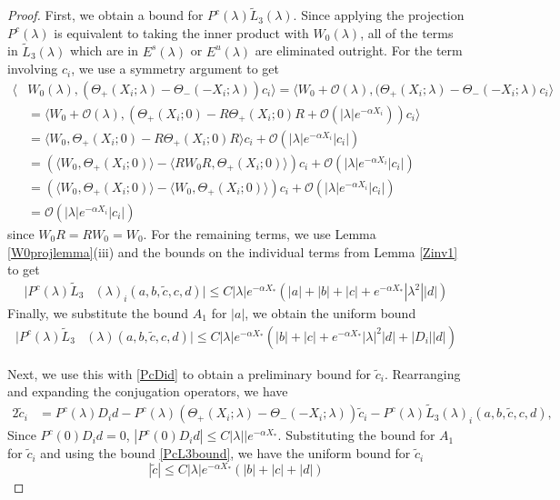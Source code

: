 \documentclass[thesis.tex]{subfiles}
\begin{document}
\begin{lemma}
\begin{proof}
First, we obtain a bound for $P^c(\lambda)\tilde{L}_3(\lambda)$. Since applying the projection $P^c(\lambda)$ is equivalent to taking the inner product with $W_0(\lambda)$, all of the terms in $\tilde{L}_3(\lambda)$ which are in $E^s(\lambda)$ or $E^u(\lambda)$ are eliminated outright. For the term involving $c_i$, we use a symmetry argument to get
\begin{align*}
\langle &W_0(\lambda), (\Theta_+(X_i; \lambda) - \Theta_-(-X_i; \lambda))c_i\rangle = \langle W_0 + \mathcal{O}(\lambda), (\Theta_+(X_i; \lambda) - \Theta_-(-X_i; \lambda) c_i \rangle \\
&= \langle W_0 + \mathcal{O}(\lambda), (\Theta_+(X_i; 0) - R \Theta_+(X_i; 0)R + \mathcal{O}(|\lambda|e^{-\alpha X_i} ))c_i \rangle \\
&= \langle W_0, \Theta_+(X_i; 0) - R \Theta_+(X_i; 0)R \rangle c_i + \mathcal{O}(|\lambda|e^{-\alpha X_i} |c_i|) \\
&= (\langle W_0, \Theta_+(X_i; 0) \rangle - \langle R W_0 R, \Theta_+(X_i; 0) \rangle) c_i + \mathcal{O}(|\lambda|e^{-\alpha X_i} |c_i|) \\
&= (\langle W_0, \Theta_+(X_i; 0) \rangle - \langle W_0, \Theta_+(X_i; 0) \rangle) c_i + \mathcal{O}(|\lambda|e^{-\alpha X_i} |c_i|) \\
&= \mathcal{O}(|\lambda|e^{-\alpha X_i} |c_i|) 
\end{align*}
since $W_0 R = R W_0 = W_0$. For the remaining terms, we use Lemma \ref{W0projlemma}(iii) and the bounds on the individual terms from Lemma \ref{Zinv1} to get
\begin{align*}
|P^c(\lambda)\tilde{L}_3&(\lambda)_i(a,b,\tilde{c},c,d)| \leq C |\lambda| e^{-\alpha X_*}  \left( |a| + |b| + |c| + e^{-\alpha X_*} |\lambda^2| |d| \right)
\end{align*}
Finally, we substitute the bound $A_1$ for $|a|$, we obtain the uniform bound
\begin{align}\label{PcL3bound}
|P^c(\lambda)\tilde{L}_3&(\lambda)(a,b,\tilde{c},c,d)| \leq C |\lambda| e^{-\alpha X_*}  \left( |b| + |c| + e^{-\alpha X_*} |\lambda|^2 |d| + |D_i||d| \right)
\end{align}

Next, we use this with \cref{PcDid} to obtain a preliminary bound for $\tilde{c}_i$. Rearranging and expanding the conjugation operators, we have
\begin{align*}
2 \tilde{c}_i &=
P^c(\lambda)D_i d - P^c(\lambda) (\Theta_+(X_i; \lambda) - \Theta_-(-X_i; \lambda))\tilde{c}_i - P^c(\lambda) \tilde{L}_3(\lambda)_i(a,b,\tilde{c},c,d),
\end{align*}
Since $P^c(0)D_i d = 0$, $|P^c(0)D_i d| \leq C |\lambda||e^{-\alpha X_*}$. Substituting the bound for $A_1$ for $\tilde{c}_i$ and using the bound \cref{PcL3bound}, we have the uniform bound for $\tilde{c}_i$
\begin{equation}\label{tildecbound1}
|\tilde{c}| \leq C |\lambda| e^{-\alpha X_*}  \left( |b| + |c| + |d| \right)
\end{equation}


\end{proof}
\end{lemma}
\end{document}

